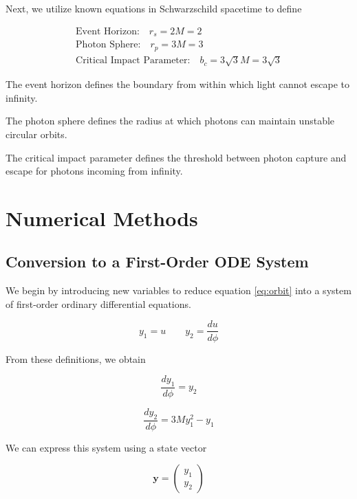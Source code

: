 \documentclass[12pt]{article}
\numberwithin{equation}{section}
\begin{document}
Next, we utilize known equations in Schwarzschild 
spacetime to define

\begin{gather}
    \text{Event Horizon:} \quad r_s = 2M = 2 \\
    \text{Photon Sphere:} \quad r_p = 3M = 3 \\
    \text{Critical Impact Parameter:} \quad
    b_c = 3\sqrt{3}M = 3\sqrt{3}
\end{gather}

The event horizon defines the boundary from within which 
light cannot escape to infinity.

The photon sphere defines the radius at which photons 
can maintain unstable circular orbits.

The critical impact parameter defines the threshold 
between photon capture and escape for photons incoming 
from infinity.

\newpage

\section{Numerical Methods}

\subsection{Conversion to a First-Order ODE System}

We begin by introducing new variables to reduce equation 
\eqref{eq:orbit} into a system of first-order ordinary 
differential equations.

\begin{equation}
    y_1 = u
    \qquad
    y_2 = \frac{du}{d\phi}
\end{equation}

From these definitions, we obtain

\begin{equation}
    \frac{dy_1}{d\phi} = y_2
\end{equation}

\begin{equation}
    \frac{dy_2}{d\phi} = 3My_1^2 - y_1
\end{equation}

We can express this system using a state vector

\begin{equation}
    \mathbf{y} =
    \begin{pmatrix}
        y_1 \\
        y_2
    \end{pmatrix}
\end{equation}
\end{document}
